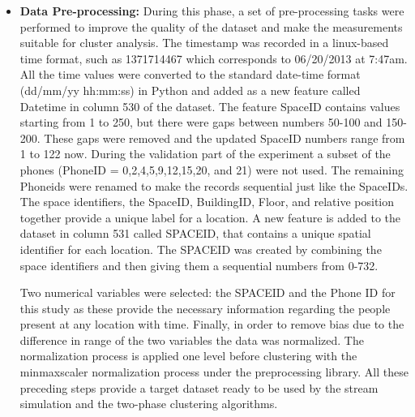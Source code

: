\documentclass[../UNBThesis2.tex]{subfiles}
\begin{document}
\begin{itemize}



\item\textbf{Data Pre-processing:}
During this phase, a set of pre-processing tasks were performed to improve the quality of the dataset and make the measurements suitable for cluster analysis.
The timestamp was recorded in a linux-based time format, such as 1371714467 which corresponds to 06/20/2013 at 7:47am. All the time values were converted to the standard date-time format (dd/mm/yy hh:mm:ss) in Python and added as a new feature called Datetime in column 530 of the dataset.
The feature SpaceID contains values starting from 1 to 250, but there were gaps between numbers 50-100 and 150-200. These gaps were removed and the updated SpaceID numbers range from 1 to 122 now. During the validation part of the experiment a subset of the phones (PhoneID = 0,2,4,5,9,12,15,20, and 21) were not used. The remaining Phoneids were renamed to make the records sequential just like the SpaceIDs. The space identifiers, the SpaceID, BuildingID, Floor, and relative position together provide a unique label for a location. A new feature is added to the dataset in column 531 called SPACEID, that contains a unique spatial identifier for each location. The SPACEID was created by combining the space identifiers and then giving them a sequential numbers from 0-732.

Two numerical variables were selected: the SPACEID and the Phone ID for this study as these provide the necessary information regarding the people present at any location with time. Finally, in order to remove bias due to the difference in range of the two variables the data was normalized. The normalization process is applied one level before clustering with the minmaxscaler normalization process under the preprocessing library. All these preceding steps provide a target dataset ready to be used by the stream simulation and the two-phase clustering algorithms. 





\end{itemize}
\end{document}

